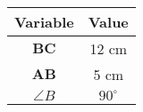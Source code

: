 \begin{center}
    \begin{tabular}{|c|c|} 
        \hline
            \textbf{Variable} & \textbf{Value} \\ 
        \hline
            $\boldsymbol{BC}$ & 12 cm \\ 
        \hline
            $\boldsymbol{AB}$ & 5 cm \\ 
        \hline
            $\angle B$  & $90^\circ$ \\
        \hline
    \end{tabular}
\end{center}  

